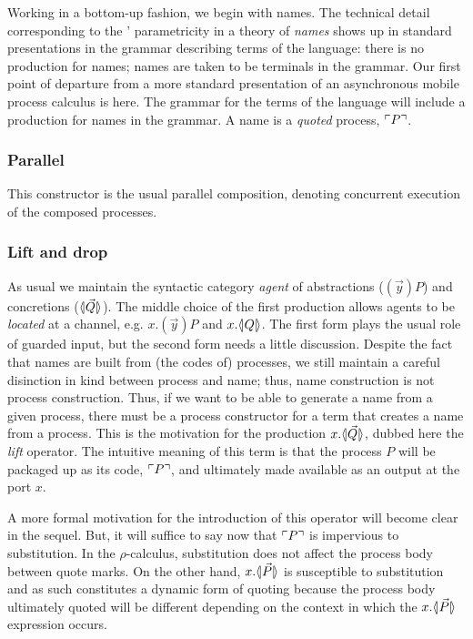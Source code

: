 Working in a bottom-up fashion, we begin with names. The technical
detail corresponding to the {\pic}' parametricity in a theory of
\textit{names} shows up in standard presentations in the grammar
describing terms of the language: there is no production for names;
names are taken to be terminals in the grammar. Our first point of
departure from a more standard presentation of an asynchronous mobile
process calculus is here. The grammar for the terms of the language
will include a production for names in the grammar. A name is a
\textit{quoted} process, $\ulcorner P \urcorner$.

\subsubsection{Parallel}

This constructor is the usual parallel composition, denoting
concurrent execution of the composed processes.

\subsubsection{Lift and drop}
As usual we maintain the syntactic category \emph{agent} of
abstractions ($(\vec{y})P$) and concretions ($\langle\!| \vec{Q} |\!\rangle$). The middle
choice of the first production allows agents to be \emph{located} at a
channel, e.g. $x.(\vec{y})P$ and $x.\langle\!| Q |\!\rangle$. The first form plays the
usual role of guarded input, but the second form needs a little
discussion. Despite the fact that names are built from (the codes of)
processes, we still maintain a careful disinction in kind between
process and name; thus, name construction is not process
construction. Thus, if we want to be able to generate a name from a
given process, there must be a process constructor for a term that
creates a name from a process. This is the motivation for the
production $x.\langle\!| \vec{Q} |\!\rangle$, dubbed here the \emph{lift} operator. The
intuitive meaning of this term is that the process $P$ will be
packaged up as its code, $\ulcorner P \urcorner$, and ultimately made available
as an output at the port $x$.

A more formal motivation for the introduction of this operator will
become clear in the sequel. But, it will suffice to say now that
$\ulcorner P \urcorner$ is impervious to substitution. In the $\rho$-calculus,
substitution does not affect the process body between quote marks. On
the other hand, $x.\langle\!| \vec{P} |\!\rangle$ is susceptible to substitution and as
such constitutes a dynamic form of quoting because the process body
ultimately quoted will be different depending on the context in which
the $x.\langle\!| \vec{P} |\!\rangle$ expression occurs.

